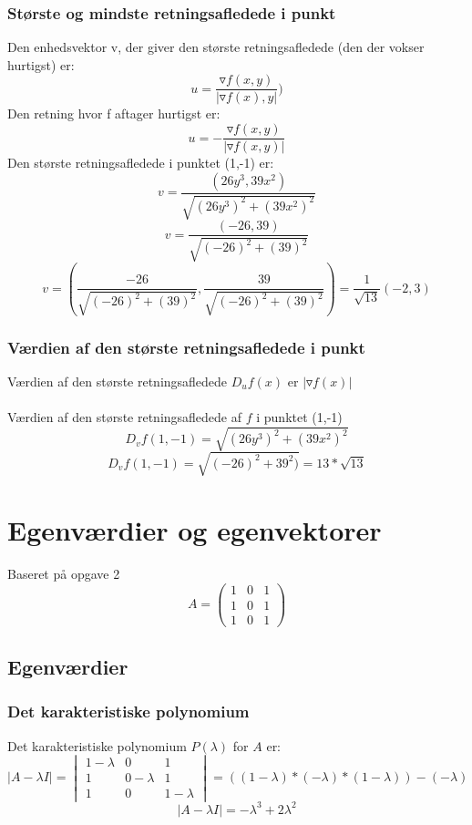 \documentclass{article}
\begin{document}
\subsubsection{Største og mindste retningsafledede i punkt}
Den enhedsvektor v, der giver den største retningsafledede (den der vokser 
hurtigst) er:
$$u=\frac{\triangledown f(x,y)}{|\triangledown f(x),y|})$$
Den retning hvor f aftager hurtigst er:
$$u=-\frac{\triangledown f(x,y)}{|\triangledown f(x,y)|}$$
\vspace{3mm}
Den største retningsafledede i punktet (1,-1) er:
$$v=\frac{(26y^3,39x^2)}{\sqrt{(26y^3)^2+(39x^2)^2}}$$
$$v=\frac{(-26,39)}{\sqrt{(-26)^2+(39)^2}}$$
$$v=\left(\frac{-26}{\sqrt{(-26)^2+(39)^2}},\frac{39}{\sqrt{(-26)^2+(39)^2}}\right)
 = \frac{1}{\sqrt{13}}(-2,3)$$

\subsubsection{Værdien af den største retningsafledede i punkt}
Værdien af den største retningsafledede $D_uf(x)$ er $|\triangledown f(x)|$\\\\
Værdien af den største retningsafledede af $f$ i punktet (1,-1)
$$D_v f(1,-1)=\sqrt{(26y^3)^2+(39x^2)^2}$$
$$D_v f(1,-1)=\sqrt{(-26)^2+39^2)}=13*\sqrt{13}$$
\newpage
\section{Egenværdier og egenvektorer}
{\tiny Baseret på opgave 2}
$$A=\begin{pmatrix}
1 & 0 & 1\\
1 & 0 & 1\\
1 & 0 & 1
\end{pmatrix}$$

\subsection{Egenværdier}

\subsubsection{Det karakteristiske polynomium}
Det karakteristiske polynomium $P(\lambda)$ for $A$ er:
$$|A-\lambda I| = \begin{vmatrix}
1-\lambda & 0 & 1\\
1 & 0-\lambda & 1\\
1 & 0 & 1-\lambda
\end{vmatrix} = ((1-\lambda)*(-\lambda)*(1-\lambda))-(-\lambda)$$
$$|A-\lambda I| = -\lambda^3+2\lambda^2$$
\end{document}
